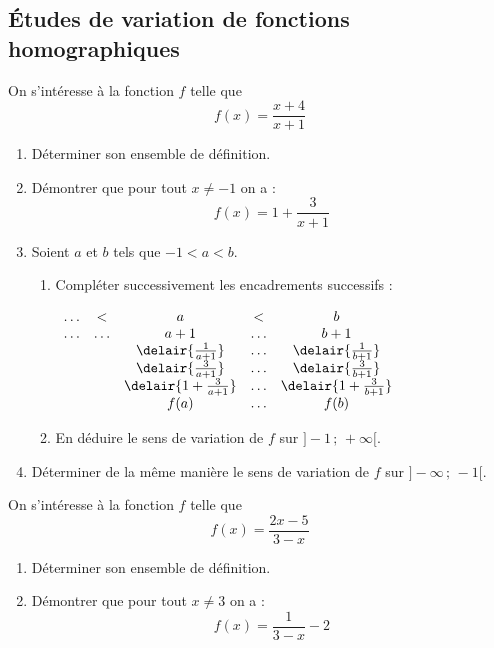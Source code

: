 \sautpage

\subsection{\'Etudes de variation de fonctions homographiques}


\vspace{-1em}\begin{multicols}{2}
\begin{exo}
On s'int\'eresse \`a la fonction $f$ telle que \[f(x)=\frac{x+4}{x+1}\]
\begin{enumerate}
 \item D\'eterminer son ensemble de d\'efinition.
 \item D\'emontrer que pour tout $x\neq-1$ on a : \[f(x)=1+\frac{3}{x+1}\]
 \item Soient $a$ et $b$ tels que $-1<a<b$.
	\begin{enumerate}
	 \item Compl\'eter successivement les encadrements successifs :
	\begin{center}
	  $\begin{array}{ccccc}
	  \ldots & < & a & <  & b \\
	  \ldots & \ldots & a+1 & \ldots  & b+1 \\
	   &  & \delair{\frac{1}{a+1}} & \ldots  & \delair{\frac{1}{b+1}} \\
	   &  & \delair{\frac{3}{a+1}} & \ldots  & \delair{\frac{3}{b+1}} \\
	   &  & \delair{1+\frac{3}{a+1}} & \ldots  & \delair{1+\frac{3}{b+1}} \\
	   &  & f(a) & \ldots  & f(b) \\
	  \end{array}$	             \end{center}
	 \item En d\'eduire le sens de variation de $f$ sur $]-1\,;\,+\infty[$.
	\end{enumerate}
 \item D\'eterminer de la m\^eme mani\`ere le sens de variation de $f$ sur $]-\infty\,;\,-1[$.
\end{enumerate}
\end{exo}


\begin{exo}
On s'int\'eresse \`a la fonction $f$ telle que \[f(x)=\frac{2x-5}{3-x}\]
\begin{enumerate}
 \item D\'eterminer son ensemble de d\'efinition.
 \item D\'emontrer que pour tout $x\neq3$ on a : \[f(x)=\frac{1}{3-x}-2\]


\end{enumerate}
\end{exo}
\end{multicols}
